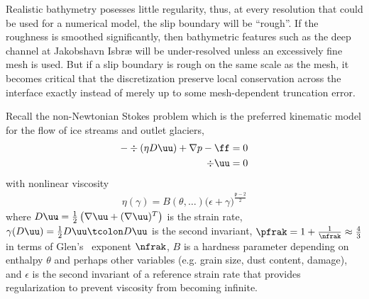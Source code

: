 Realistic bathymetry posesses little regularity, thus, at every resolution that could be used for a numerical model, the slip boundary will be ``rough''.
If the roughness is smoothed significantly, then bathymetric features such as the deep channel at Jakobshavn Isbr{\ae} will be under-resolved unless an excessively fine mesh is used.
But if a slip boundary is rough on the same scale as the mesh, it becomes critical that the discretization preserve local conservation across the interface exactly instead of merely up to some mesh-dependent truncation error.

Recall the non-Newtonian Stokes problem which is the preferred kinematic model for the flow of ice streams and outlet glaciers,
\begin{subequations}\label{eq:slip:stokes-strong}
  \begin{align}
    -\div(\eta D\uu) + \nabla p - \ff &= 0 \\
    \div \uu &= 0
  \end{align}
\end{subequations}
with nonlinear viscosity
\begin{gather}
  \eta(\gamma) = B(\theta,\dotsc)\big(\epsilon + \gamma \big)^{\frac{\mathfrak{p}-2}{2}}
\end{gather}
where $D\uu = \tfrac 1 2 \left(\nabla \uu + (\nabla \uu)^T \right)$ is the strain rate, $\gamma(D\uu) = \tfrac 1 2 D\uu \tcolon D\uu$ is the second invariant, $\pfrak = 1 + \tfrac{1}{\nfrak} \approx \tfrac 4 3$ in terms of Glen's~\citeyearpar{glen1955creep} exponent $\nfrak$, $B$ is a hardness parameter depending on enthalpy $\theta$ and perhaps other variables (e.g. grain size, dust content, damage), and $\epsilon$ is the second invariant of a reference strain rate that provides regularization to prevent viscosity from becoming infinite.

